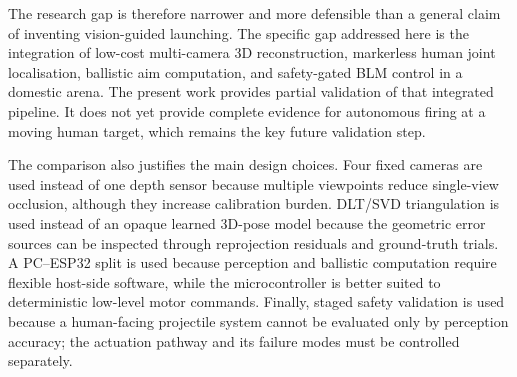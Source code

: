 The research gap is therefore narrower and more defensible than a general claim of inventing vision-guided launching. The specific gap addressed here is the integration of low-cost multi-camera 3D reconstruction, markerless human joint localisation, ballistic aim computation, and safety-gated BLM control in a domestic arena. The present work provides partial validation of that integrated pipeline. It does not yet provide complete evidence for autonomous firing at a moving human target, which remains the key future validation step.

The comparison also justifies the main design choices. Four fixed cameras are used instead of one depth sensor because multiple viewpoints reduce single-view occlusion, although they increase calibration burden. DLT/SVD triangulation is used instead of an opaque learned 3D-pose model because the geometric error sources can be inspected through reprojection residuals and ground-truth trials. A PC--ESP32 split is used because perception and ballistic computation require flexible host-side software, while the microcontroller is better suited to deterministic low-level motor commands. Finally, staged safety validation is used because a human-facing projectile system cannot be evaluated only by perception accuracy; the actuation pathway and its failure modes must be controlled separately.
